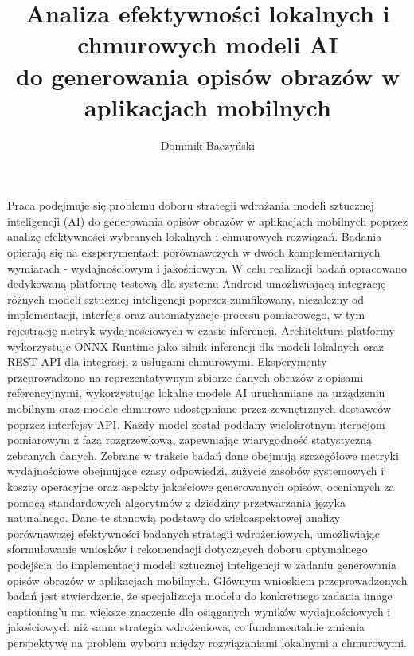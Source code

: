 \documentclass[
    bindingoffset=5mm,  %
    footnoteindent=3mm, %
    hyphenation=false    %
]{src/wut-thesis}
\begin{document}
\title{
    Analiza efektywności lokalnych i chmurowych modeli AI \\
    do generowania opisów obrazów w aplikacjach mobilnych
}

\author{Dominik Baczyński}
\date{\the\year}
\maketitle

\cleardoublepage %
\abstract 
Praca podejmuje się problemu doboru strategii wdrażania modeli sztucznej inteligencji (AI) do generowania opisów obrazów w aplikacjach mobilnych
poprzez analizę efektywności wybranych lokalnych i chmurowych rozwiązań. 
Badania opierają się na eksperymentach porównawczych w dwóch komplementarnych wymiarach - wydajnościowym i jakościowym.
W celu realizacji badań opracowano dedykowaną platformę testową dla systemu Android umożliwiającą integrację różnych modeli sztucznej inteligencji poprzez zunifikowany, niezależny od 
implementacji, interfejs oraz automatyzacje procesu pomiarowego, w tym rejestrację metryk wydajnościowych w czasie inferencji.
Architektura platformy wykorzystuje ONNX Runtime jako silnik inferencji dla modeli lokalnych oraz REST API dla integracji z usługami chmurowymi.
Eksperymenty przeprowadzono na reprezentatywnym zbiorze danych obrazów z opisami referencyjnymi, wykorzystując lokalne modele AI uruchamiane na urządzeniu mobilnym
oraz modele chmurowe udostępniane przez zewnętrznych dostawców poprzez interfejsy API.
Każdy model został poddany wielokrotnym iteracjom pomiarowym z fazą rozgrzewkową, zapewniając wiarygodność statystyczną zebranych danych.
Zebrane w trakcie badań dane obejmują szczegółowe metryki wydajnościowe obejmujące czasy odpowiedzi, zużycie zasobów systemowych i 
koszty operacyjne oraz aspekty jakościowe generowanych opisów, ocenianych za pomocą standardowych algorytmów z dziedziny przetwarzania języka naturalnego.
Dane te stanowią podstawę do wieloaspektowej analizy porównawczej efektywności badanych strategii wdrożeniowych, umożliwiając sformułowanie wniosków
i rekomendacji dotyczących doboru optymalnego podejścia do implementacji modeli sztucznej inteligencji w zadaniu generowania opisów obrazów w aplikacjach mobilnych.
Głównym wnioskiem przeprowadzonych badań jest stwierdzenie, że specjalizacja modelu do konkretnego zadania image captioning'u ma większe znaczenie 
dla osiąganych wyników wydajnościowych i jakościowych niż sama strategia wdrożeniowa, co fundamentalnie zmienia perspektywę na problem wyboru 
między rozwiązaniami lokalnymi a chmurowymi.
\end{document}
